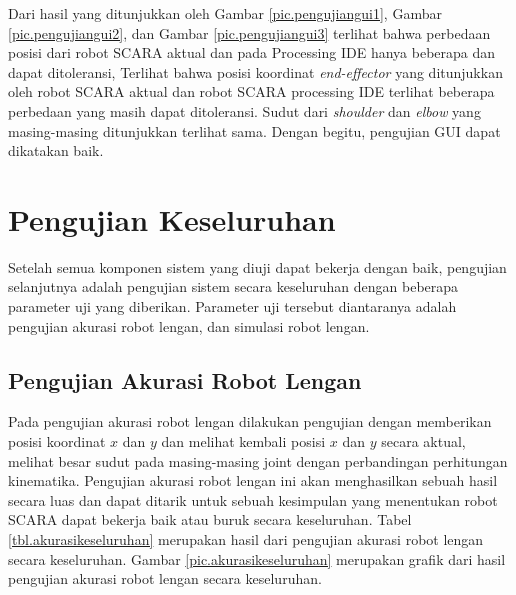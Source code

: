 Dari hasil yang ditunjukkan oleh Gambar \ref{pic.pengujiangui1}, Gambar \ref{pic.pengujiangui2}, dan Gambar \ref{pic.pengujiangui3} terlihat bahwa perbedaan posisi dari robot SCARA aktual dan pada Processing IDE hanya beberapa dan dapat ditoleransi, Terlihat bahwa posisi koordinat\textit{ end-effector }yang ditunjukkan oleh robot SCARA aktual dan robot SCARA processing IDE terlihat beberapa perbedaan yang masih dapat ditoleransi. Sudut dari \textit{shoulder} dan \textit{elbow} yang masing-masing ditunjukkan terlihat sama. Dengan begitu, pengujian GUI dapat dikatakan baik.

\section{Pengujian Keseluruhan}
Setelah semua komponen sistem yang diuji dapat bekerja dengan baik, pengujian selanjutnya adalah pengujian sistem secara keseluruhan dengan beberapa parameter uji yang diberikan. Parameter uji tersebut diantaranya adalah pengujian akurasi robot lengan, dan simulasi robot lengan. 

\subsection{Pengujian Akurasi Robot Lengan}
Pada pengujian akurasi robot lengan dilakukan pengujian dengan memberikan posisi koordinat $x$ dan $y$ dan melihat kembali posisi $x$ dan $y$ secara aktual, melihat besar sudut pada masing-masing joint dengan perbandingan perhitungan kinematika. Pengujian akurasi robot lengan ini akan menghasilkan sebuah hasil secara luas dan dapat ditarik untuk sebuah kesimpulan yang menentukan robot SCARA dapat bekerja baik atau buruk secara keseluruhan. Tabel \ref{tbl.akurasikeseluruhan} merupakan hasil dari pengujian akurasi robot lengan secara keseluruhan. Gambar \ref{pic.akurasikeseluruhan} merupakan grafik dari hasil pengujian akurasi robot lengan secara keseluruhan.

